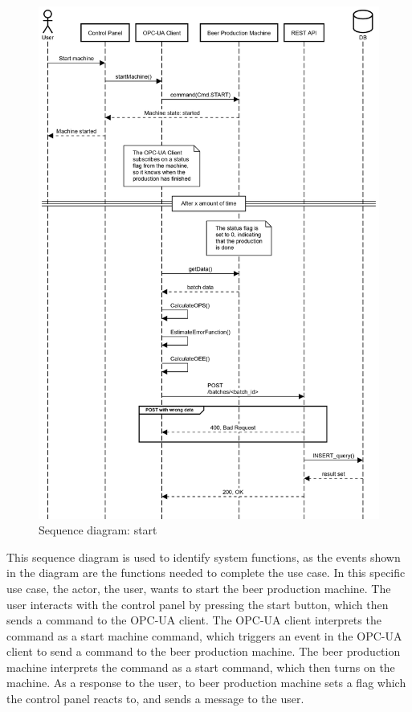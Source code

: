 \begin{figure}[H]
\centering 
\includegraphics[scale=0.3]{images/sequence_operation/start.png}
\caption{Sequence diagram: start}
\label{figure:sequence_diagram} 
\end{figure}

This sequence diagram is used to identify system functions, as the events shown
in the diagram are the functions needed to complete the use case. In this
specific use case, the actor, the user, wants to start the beer production
machine. The user interacts with the control panel by pressing the start button,
which then sends a command to the OPC-UA client. The OPC-UA client interprets
the command as a start machine command, which triggers an event in the OPC-UA
client to send a command to the beer production machine. The beer production
machine interprets the command as a start command, which then turns on the 
machine. As a response to the user, to beer production machine sets a flag
which the control panel reacts to, and sends a message to the user. \\

